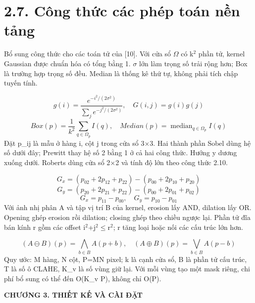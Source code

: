 \documentclass[12pt,a4paper]{extreport}
\begin{document}
\section*{2.7. Công thức các phép toán nền tảng}
Bổ sung công thức cho các toán tử của [10]. Với cửa sổ \ensuremath{\Omega} có k\ensuremath{{}^2} phần tử,\allowbreak{} kernel Gaussian được chuẩn hóa có tổng bằng 1. \ensuremath{\sigma} lớn làm trọng số trải rộng hơn; Box là trường hợp trọng số đều. Median là thống kê thứ tự,\allowbreak{} không phải tích chập tuyến tính.
\par
\begin{equation}g(i)=\frac{e^{-i^2/(2\sigma^2)}}{\sum_j e^{-j^2/(2\sigma^2)}},\quad G(i,j)=g(i)g(j)\tag{2.17}\end{equation}
\begin{equation}Box(p)=\frac{1}{k^2}\sum_{q\in\Omega_p}I(q),\quad Median(p)=\operatorname{median}_{q\in\Omega_p}I(q)\tag{2.18}\end{equation}
Đặt p\_ij là mẫu ở hàng i,\allowbreak{} cột j trong cửa sổ 3\ensuremath{\times}3. Hai thành phần Sobel dùng hệ số dưới đây; Prewitt thay hệ số 2 bằng 1 ở cả hai công thức. Hướng y dương xuống dưới. Roberts dùng cửa sổ 2\ensuremath{\times}2 và tính độ lớn theo công thức 2.10.
\par
\begin{equation}G_x=(p_{02}+2p_{12}+p_{22})-(p_{00}+2p_{10}+p_{20})\tag{2.19}\end{equation}
\begin{equation}G_y=(p_{20}+2p_{21}+p_{22})-(p_{00}+2p_{01}+p_{02})\tag{2.20}\end{equation}
\begin{equation}G_x=p_{11}-p_{00},\quad G_y=p_{10}-p_{01}\tag{2.21}\end{equation}
Với ảnh nhị phân A và tập vị trí B của kernel,\allowbreak{} erosion lấy AND,\allowbreak{} dilation lấy OR. Opening ghép erosion rồi dilation; closing ghép theo chiều ngược lại. Phần tử đĩa bán kính r gồm các offset i\ensuremath{{}^2}+\allowbreak{}j\ensuremath{{}^2}\ensuremath{\leq}r\ensuremath{{}^2}; r tăng loại hoặc nối các cấu trúc lớn hơn.
\par
\begin{equation}(A\ominus B)(p)=\bigwedge_{b\in B}A(p+b),\quad (A\oplus B)(p)=\bigvee_{b\in B}A(p-b)\tag{2.22}\end{equation}
Quy ước: M hàng,\allowbreak{} N cột,\allowbreak{} P=\allowbreak{}MN pixel; k là cạnh cửa sổ,\allowbreak{} B là phần tử cấu trúc,\allowbreak{} T là số ô CLAHE,\allowbreak{} K\_v là số vùng giữ lại. Với mỗi vùng tạo một mask riêng,\allowbreak{} chi phí bổ sung có thể đến O(K\_v P),\allowbreak{} không chỉ O(P).
\par
\clearpage
\begin{center}\Large\bfseries CHƯƠNG 3. THIẾT KẾ VÀ CÀI ĐẶT\end{center}
\end{document}
